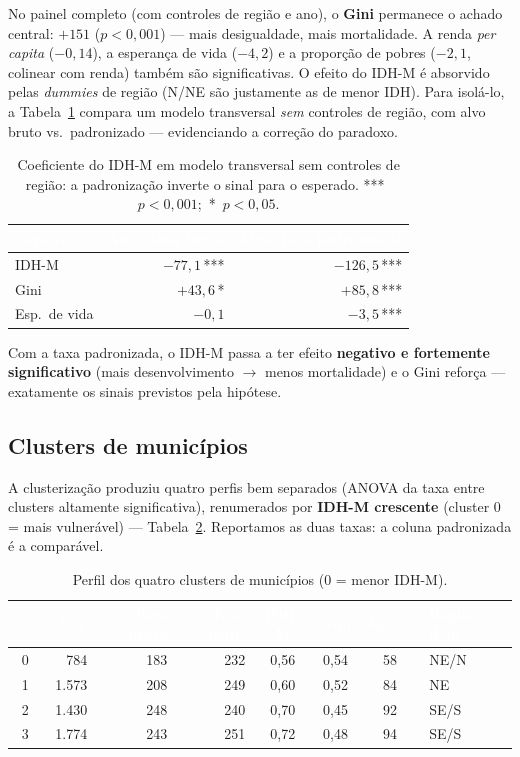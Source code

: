 \documentclass[11pt,a4paper]{article}
\newcommand{\hdr}[1]{\textcolor{white}{\textbf{#1}}}
\begin{document}
No painel completo (com controles de região e ano), o \textbf{Gini} permanece o achado central:
$+151$ ($p<0{,}001$) --- mais desigualdade, mais mortalidade. A renda \emph{per capita}
($-0{,}14$), a esperança de vida ($-4{,}2$) e a proporção de pobres ($-2{,}1$, colinear com
renda) também são significativas. O efeito do IDH-M é absorvido pelas \emph{dummies} de região
(N/NE são justamente as de menor IDH). Para isolá-lo, a Tabela~\ref{tab:coef} compara um modelo
transversal \emph{sem} controles de região, com alvo bruto vs.\ padronizado --- evidenciando a
correção do paradoxo.

\begin{table}[htbp]
\centering\small
\caption{Coeficiente do IDH-M em modelo transversal sem controles de região: a padronização
inverte o sinal para o esperado. \mbox{*** $p<0{,}001$;\ * $p<0{,}05$.}}
\label{tab:coef}
\begin{tabular}{l r r}
\rowcolor{cinzahdr}
\hdr{Variável} & \hdr{Alvo: taxa bruta} & \hdr{Alvo: taxa padronizada} \\
\midrule
IDH-M    & $-77{,}1$\,***  & $-126{,}5$\,*** \\
Gini     & $+43{,}6$\,*    & $+85{,}8$\,***  \\
Esp.\ de vida & $-0{,}1$   & $-3{,}5$\,***   \\
\bottomrule
\end{tabular}
\end{table}

Com a taxa padronizada, o IDH-M passa a ter efeito \textbf{negativo e fortemente significativo}
(mais desenvolvimento $\rightarrow$ menos mortalidade) e o Gini reforça --- exatamente os sinais
previstos pela hipótese.

\subsection{Clusters de municípios}

A clusterização produziu quatro perfis bem separados (ANOVA da taxa entre clusters altamente
significativa), renumerados por \textbf{IDH-M crescente} (cluster 0 = mais vulnerável)
--- Tabela~\ref{tab:clusters}. Reportamos as duas taxas: a coluna padronizada é a comparável.

\begin{table}[htbp]
\centering\small
\caption{Perfil dos quatro clusters de municípios (0 = menor IDH-M).}
\label{tab:clusters}
\begin{tabular}{c r r r c c c l}
\rowcolor{cinzahdr}
\hdr{Cl.} & \hdr{Mun.} & \hdr{Taxa bruta} & \hdr{Taxa padr.} & \hdr{IDH-M} & \hdr{Gini} & \hdr{Água\%} & \hdr{Região dom.} \\
\midrule
0 &  784 & 183 & 232 & 0,56 & 0,54 & 58 & NE/N \\
1 & 1.573 & 208 & 249 & 0,60 & 0,52 & 84 & NE \\
2 & 1.430 & 248 & 240 & 0,70 & 0,45 & 92 & SE/S \\
3 & 1.774 & 243 & 251 & 0,72 & 0,48 & 94 & SE/S \\
\bottomrule
\end{tabular}
\end{table}
\end{document}
